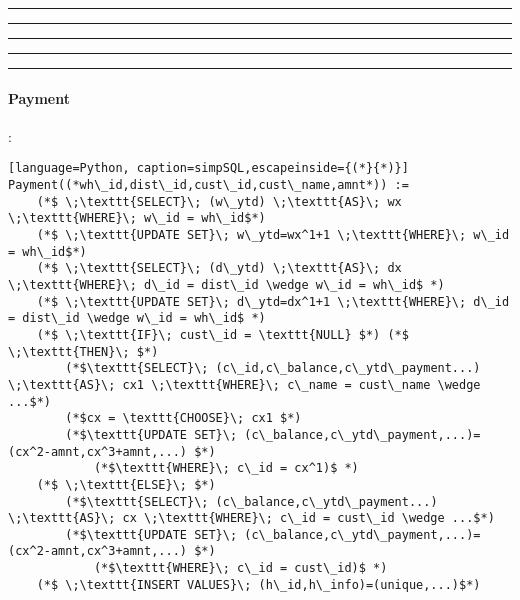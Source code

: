 \hrule
\hrule
\hrule
\hrule
\hrule
\vspace{2mm}


\paragraph{Payment}:
\lstset{style=simpSQLstyle}
\begin{lstlisting}[language=Python, caption=simpSQL,escapeinside={(*}{*)}]
Payment((*wh\_id,dist\_id,cust\_id,cust\_name,amnt*)) :=
	(*$ \;\texttt{SELECT}\; (w\_ytd) \;\texttt{AS}\; wx \;\texttt{WHERE}\; w\_id = wh\_id$*)
	(*$ \;\texttt{UPDATE SET}\; w\_ytd=wx^1+1 \;\texttt{WHERE}\; w\_id = wh\_id$*)
	(*$ \;\texttt{SELECT}\; (d\_ytd) \;\texttt{AS}\; dx \;\texttt{WHERE}\; d\_id = dist\_id \wedge w\_id = wh\_id$ *)
	(*$ \;\texttt{UPDATE SET}\; d\_ytd=dx^1+1 \;\texttt{WHERE}\; d\_id = dist\_id \wedge w\_id = wh\_id$ *)
	(*$ \;\texttt{IF}\; cust\_id = \texttt{NULL} $*) (*$ \;\texttt{THEN}\; $*) 
		(*$\texttt{SELECT}\; (c\_id,c\_balance,c\_ytd\_payment...) \;\texttt{AS}\; cx1 \;\texttt{WHERE}\; c\_name = cust\_name \wedge ...$*)
		(*$cx = \texttt{CHOOSE}\; cx1 $*) 
		(*$\texttt{UPDATE SET}\; (c\_balance,c\_ytd\_payment,...)=(cx^2-amnt,cx^3+amnt,...) $*)
			(*$\texttt{WHERE}\; c\_id = cx^1)$ *)
	(*$ \;\texttt{ELSE}\; $*)
		(*$\texttt{SELECT}\; (c\_balance,c\_ytd\_payment...) \;\texttt{AS}\; cx \;\texttt{WHERE}\; c\_id = cust\_id \wedge ...$*)
		(*$\texttt{UPDATE SET}\; (c\_balance,c\_ytd\_payment,...)=(cx^2-amnt,cx^3+amnt,...) $*)
			(*$\texttt{WHERE}\; c\_id = cust\_id)$ *)
	(*$ \;\texttt{INSERT VALUES}\; (h\_id,h\_info)=(unique,...)$*)
\end{lstlisting}

